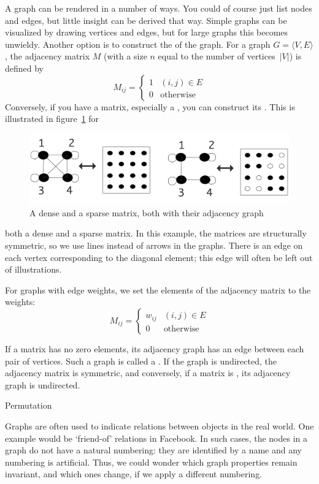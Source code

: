 A graph can be rendered in a number of ways. You could of course just
list nodes and edges, but little insight can be derived that way.
Simple graphs can be  visualized by drawing vertices and edges, but
for large graphs this becomes unwieldy. Another option is to construct
the  of the graph. For a graph $G=\langle
V,E\rangle$, the adjacency matrix $M$ (with a size $n$ equal to the
number of vertices~$|V|$) is defined by
\[ 
  M_{ij}=
  \begin{cases}1&(i,j)\in E\\ 0&\mbox{otherwise}\end{cases}
\]
Conversely, if you have a matrix, especially a
, you can construct its
.
This is illustrated in figure~\ref{fig:matrix-graph} for
\begin{figure}[ht]
  \includegraphics[scale=.14]{graphics-public/matrix-graph}
  \caption{A dense and a sparse matrix, both with their adjacency
    graph}
  \label{fig:matrix-graph}
\end{figure}
both a dense and a sparse matrix. In this example, the matrices are
structurally symmetric, so we use lines instead of arrows in the
graphs. There is an edge on each vertex corresponding to the diagonal
element; this edge will often be left out of illustrations.

For graphs with edge weights, we set the elements of the adjacency
matrix to the weights:
\[ 
  M_{ij}=
  \begin{cases}w_{ij}&(i,j)\in E\\ 0&\mbox{otherwise}\end{cases}
\]

If a matrix has no zero elements, its adjacency graph has an edge
between each pair of vertices. Such a graph is called a
.
If the graph is undirected, the adjacency matrix is symmetric, and
conversely, if a matrix is , its
adjacency graph is undirected.

 {Permutation}

Graphs are often used to indicate relations between objects in the 
real world. One example would be `friend-of' relations in Facebook.
In such cases, the nodes in a graph do not have a natural numbering:
they are identified by a name and any numbering is artificial.
Thus, we could wonder which graph properties remain invariant,
and which ones change, if we apply a different numbering.

